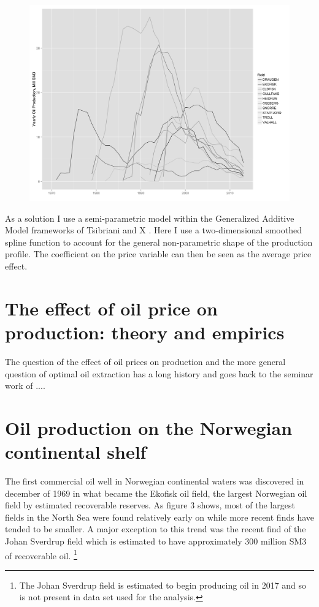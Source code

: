 \documentclass[12pt]{scrartcl} %
\begin{document}
\begin{figure}
	\includegraphics[width=.8\textwidth]{top10_production.png}
	\end{figure}

As a solution I use a semi-parametric model within the Generalized Additive Model frameworks of Tsibriani and X \cite{tsibriani1990}.  Here I use a two-dimensional smoothed spline function to account for the general non-parametric shape of the production profile.  The coefficient on the price variable can then be seen as the average price effect.  

\section{The effect of oil price on production: theory and empirics}
The question of the effect of oil prices on production and the more general question of optimal oil extraction has a long history and goes back to the seminar work of \citet{hotelling31}....

\section{Oil production on the Norwegian continental shelf}
The first commercial oil well in Norwegian continental waters was discovered in december of 1969 in what became the Ekofisk oil field, the largest Norwegian oil field by estimated recoverable reserves.  As figure 3 shows, most of the largest fields in the North Sea were found relatively early on while more recent finds have tended to be smaller.  A major exception to this trend was the recent find of the Johan Sverdrup field which is estimated to have approximately 300 million SM3 of recoverable oil. \footnote{The Johan Sverdrup field is estimated to begin producing oil in 2017 and so is not present in data set used for the analysis.}  
\end{document}
